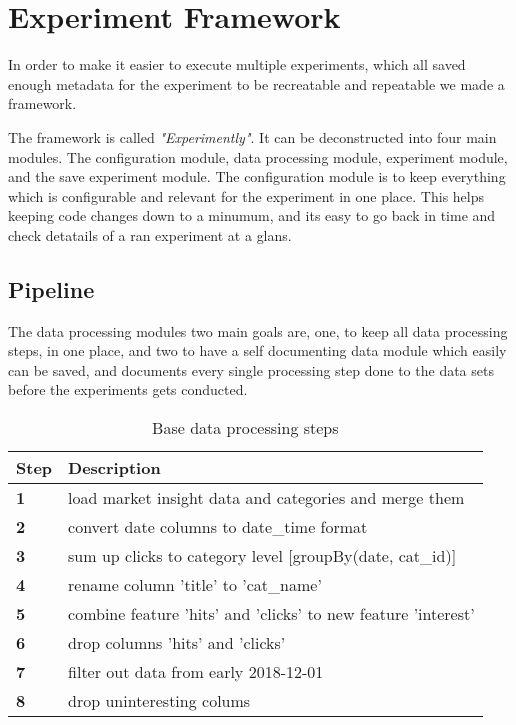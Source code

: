 \section{Experiment Framework}
\label{section:method:experiment-framework}
In order to make it easier to execute multiple experiments, which all saved
enough metadata for the experiment to be recreatable and repeatable we made
a framework.

The framework is called \textit{"Experimently"}. It can be deconstructed into
four main modules. The configuration module, data processing module, experiment module, and the save experiment module.
The configuration module is to keep everything which is configurable and relevant
for the experiment in one place. This helps keeping code changes down to a minumum,
and its easy to go back in time and check detatails of a ran experiment at a glans.


\subsection{Pipeline}
\label{section:Method:Pipeline}
The data processing modules two main goals are, one, to keep all data processing steps,
in one place, and two to have a self documenting data module which easily can be
saved, and documents every single processing step done to the data sets before the
experiments gets conducted.


\begin{table}[h]
  \centering
  \caption{Base data processing steps}
  \label{table:base_data_processing_steps}
  \begin{tabular}{ll}
    \toprule
    Step       & Description                                                   \\
    \midrule
    \textbf{1} & load market insight data and categories and merge them        \\
    \textbf{2} & convert date columns to date\_time format                     \\
    \textbf{3} & sum up clicks to category level [groupBy(date, cat\_id)]      \\
    \textbf{4} & rename column 'title' to 'cat\_name'                          \\
    \textbf{5} & combine feature 'hits' and 'clicks' to new feature 'interest' \\
    \textbf{6} & drop columns 'hits' and 'clicks'                              \\
    \textbf{7} & filter out data from early 2018-12-01                         \\
    \textbf{8} & drop uninteresting colums                                     \\
    \bottomrule
  \end{tabular}
\end{table}

